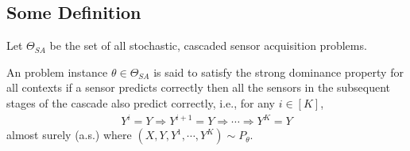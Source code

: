 \subsection{Some Definition}
Let $\Theta_{SA}$ be the set of all stochastic, cascaded sensor acquisition problems.
\begin{define} An problem instance $\theta \in \Theta_{SA}$ is said to satisfy the strong dominance property for all contexts if a sensor predicts correctly then all the sensors in the subsequent stages of the cascade also predict correctly, i.e., for any $i \in [K]$,
	\begin{align} \label{equ:SD}
Y^i = Y \Rightarrow  Y^{i+1} = Y \Rightarrow \cdots \Rightarrow Y^K = Y
	\end{align}
	almost surely (a.s.) where $(X, Y, Y^1, \cdots , Y^K) \sim P_\theta$.
\end{define} 

